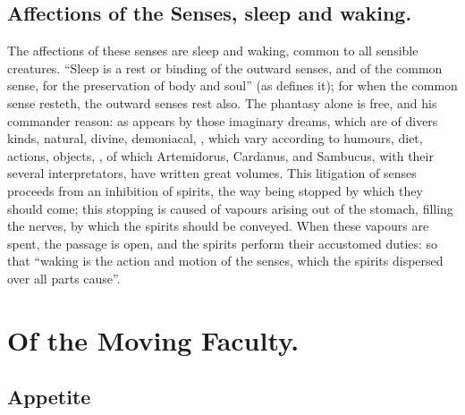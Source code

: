 \subsection{Affections of the Senses, sleep and waking.}

The affections of these senses are sleep and waking, common to all sensible
creatures. \enquote{Sleep is a rest or binding of the outward senses, and of the common
sense, for the preservation of body and soul} (as \Scaliger{}
defines it); for when the common sense resteth, the outward
senses rest also. The phantasy alone is free, and his commander reason: as
appears by those imaginary dreams, which are of divers kinds, natural, divine,
demoniacal, \etc{}, which vary according to humours, diet, actions, objects,
\etc{}, of which Artemidorus, Cardanus, and Sambucus, with their several
interpretators, have written great volumes. This litigation of senses proceeds
from an inhibition of spirits, the way being stopped by which they should come;
this stopping is caused of vapours arising out of the stomach, filling the
nerves, by which the spirits should be conveyed. When these vapours are spent,
the passage is open, and the spirits perform their accustomed duties: so that
\enquote{waking is the action and motion of the senses, which the spirits dispersed
over all parts cause}.

\section{Of the Moving Faculty.}

\subsection{Appetite}


